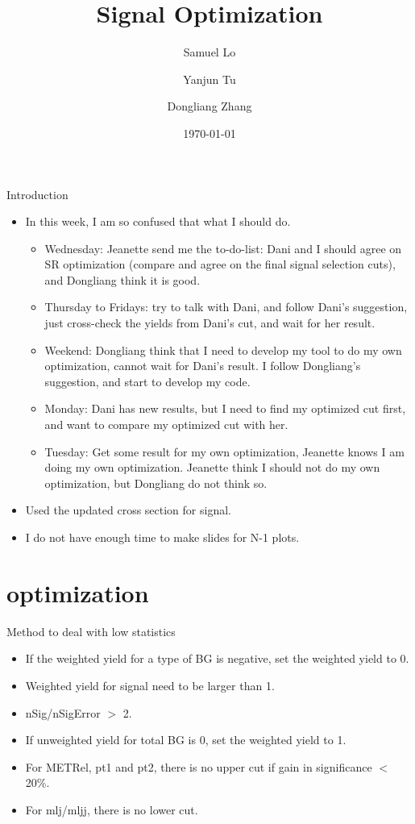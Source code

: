 \documentclass[mathserif,serif]{beamer}
\title[]{Signal Optimization}
\author[]
{
Samuel Lo \inst{1}
\and
Yanjun Tu  \inst{1}
\and
Dongliang Zhang  \inst{2}
}
\institute[]
{
\inst{1}
The University of Hong Kong
\and
\inst{2}
University of Michigan
}
\date[]{\today}
\begin{document}
\frame{\titlepage}

\begin{frame}{Introduction}
\begin{itemize}
\item In this week, I am so confused that what I should do.
\begin{itemize}
\item Wednesday: Jeanette send me the to-do-list: Dani and I should agree on SR optimization (compare and agree on the final signal selection cuts), and Dongliang think it is good.
\item Thursday to Fridays: try to talk with Dani, and follow Dani's suggestion, just cross-check the yields from Dani's cut, and wait for her result.
\item Weekend: Dongliang think that I need to develop my tool to do my own optimization, cannot wait for Dani's result. I follow Dongliang's suggestion, and start to develop my code.
\item Monday: Dani has new results, but I need to find my optimized cut first, and want to compare my optimized cut with her.
\item Tuesday: Get some result for my own optimization, Jeanette knows I am doing my own optimization. Jeanette think I should not do my own optimization, but Dongliang do not think so.
\end{itemize}
\item Used the updated cross section for signal.
\item I do not have enough time to make slides for N-1 plots.
\end{itemize}
\end{frame}

\section{optimization}
\begin{frame}{Method to deal with low statistics}
\begin{itemize}
\item If the weighted yield for a type of BG is negative, set the weighted yield to 0.
\item Weighted yield for signal need to be larger than 1.
\item nSig/nSigError $>$ 2.
\item If unweighted yield for total BG is 0, set the weighted yield to 1.
\item For METRel, pt1 and pt2, there is no upper cut if gain in significance $<$ 20\%.
\item For mlj/mljj, there is no lower cut.
\end{itemize}
\end{frame}
\end{document}
